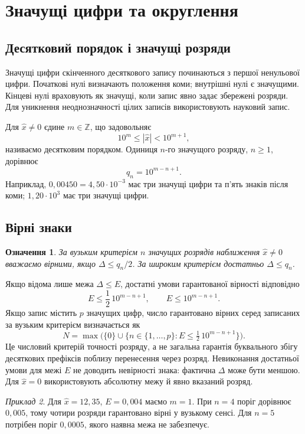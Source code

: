 \documentclass[11pt,a4paper]{article}
\newtheorem{definition}{Означення}[section]
\theoremstyle{remark}
\newtheorem{example}[definition]{Приклад}
\newcommand{\xh}{\widehat x}
\begin{document}
\section{Значущі цифри та округлення}
\subsection*{Десятковий порядок і значущі розряди}
Значущі цифри скінченного десяткового запису починаються з першої ненульової цифри. Початкові нулі визначають положення коми; внутрішні нулі є значущими. Кінцеві нулі враховують як значущі, коли запис явно задає збережені розряди. Для уникнення неоднозначності цілих записів використовують науковий запис.

Для $\xh\ne0$ єдине $m\in\mathbb Z$, що задовольняє
\[
 10^m\le|\xh|<10^{m+1},
\]
називаємо десятковим порядком. Одиниця $n$-го значущого розряду, $n\ge1$, дорівнює
\begin{equation}
 q_n=10^{m-n+1}.
\end{equation}
Наприклад, $0{,}00450=4{,}50\cdot10^{-3}$ має три значущі цифри та п'ять знаків після коми; $1{,}20\cdot10^3$ має три значущі цифри.

\subsection*{Вірні знаки}
\begin{definition}
За вузьким критерієм $n$ значущих розрядів наближення $\xh\ne0$ вважаємо вірними, якщо $\Delta\le q_n/2$. За широким критерієм достатньо $\Delta\le q_n$.
\end{definition}
Якщо відома лише межа $\Delta\le E$, достатні умови гарантованої вірності відповідно
\begin{equation}
 E\le\frac12\,10^{m-n+1},\qquad E\le10^{m-n+1}.
\end{equation}
Якщо запис містить $p$ значущих цифр, число гарантовано вірних серед записаних за вузьким критерієм визначається як
\[
 N=\max\bigl(\{0\}\cup\{n\in\{1,\ldots,p\}: E\le\tfrac12\,10^{m-n+1}\}\bigr).
\]
Це числовий критерій точності розряду, а не загальна гарантія буквального збігу десяткових префіксів поблизу перенесення через розряд. Невиконання достатньої умови для межі $E$ не доводить невірності знака: фактична $\Delta$ може бути меншою. Для $\xh=0$ використовують абсолютну межу й явно вказаний розряд.
\begin{example}
Для $\xh=12{,}35$, $E=0{,}004$ маємо $m=1$. При $n=4$ поріг дорівнює $0{,}005$, тому чотири розряди гарантовано вірні у вузькому сенсі. Для $n=5$ потрібен поріг $0{,}0005$, якого наявна межа не забезпечує.
\end{example}
\end{document}
